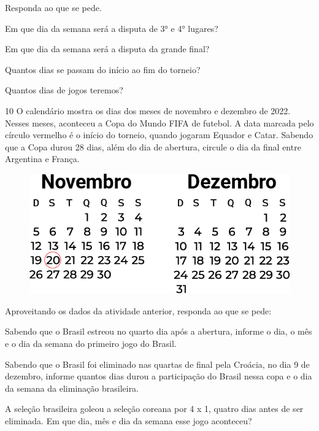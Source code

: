 Responda ao que se pede.

\begin{escolha}[itemsep=-5pt]
\item Em que dia da semana será a disputa de 3° e 4° lugares?

\item Em que dia da semana será a disputa da grande final?

\item Quantos dias se passam do início ao fim do torneio?

\item Quantos dias de jogos teremos?
\end{escolha}

\pagebreak
\num{10} O calendário mostra os dias dos meses de novembro e dezembro de
2022. Nesses meses, aconteceu a Copa do Mundo FIFA de futebol. A data
marcada pelo círculo vermelho é o início do torneio, quando jogaram
Equador e Catar. Sabendo que a Copa durou 28 dias, além do dia de abertura, circule o dia da
final entre Argentina e França.


\begin{figure}[htpb!]
\includegraphics[width=\textwidth]{./media/image59.png}
\end{figure}

Aproveitando os dados da atividade anterior, responda ao que se pede:

\begin{escolha}[itemsep=-5pt]
\item Sabendo que o Brasil estreou no quarto dia após a abertura, informe o dia, o
  mês e o dia da semana do primeiro jogo do Brasil.

\item Sabendo que o Brasil foi eliminado nas quartas de final pela Croácia,
  no dia 9 de dezembro, informe quantos dias durou a participação do
  Brasil nessa copa e o dia da semana da eliminação brasileira.

\item A seleção brasileira goleou a seleção coreana por 4 x 1, quatro dias
  antes de ser eliminada. Em que dia, mês e dia da semana esse jogo
  aconteceu?
\end{escolha}

